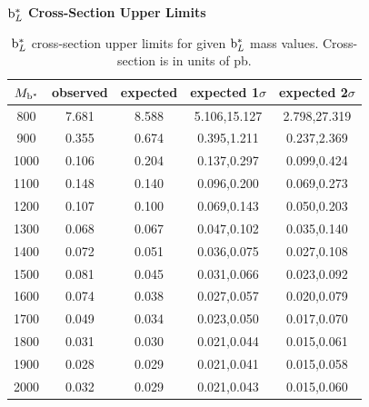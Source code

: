 \begin{table}
\begin{center}
\bf{$\mathrm{b}^{*}_L$ Cross-Section Upper Limits}\\
\begin{tabular}{|c||c|c|c|c|}
\hline
\bf{$M_{\mathrm{b}^{*}}$} & \bf{observed}  & \bf{expected} & \bf{expected 1$\sigma$}  & \bf{expected 2$\sigma$} \\
\hline
\hline
800 & 7.681 & 8.588 & 5.106,15.127 & 2.798,27.319\\ 
\hline
900 & 0.355 & 0.674 & 0.395,1.211 & 0.237,2.369\\ 
\hline
1000 & 0.106 & 0.204 & 0.137,0.297 & 0.099,0.424\\ 
\hline
1100 & 0.148 & 0.140 & 0.096,0.200 & 0.069,0.273\\ 
\hline
1200 & 0.107 & 0.100 & 0.069,0.143 & 0.050,0.203\\ 
\hline
1300 & 0.068 & 0.067 & 0.047,0.102 & 0.035,0.140\\ 
\hline
1400 & 0.072 & 0.051 & 0.036,0.075 & 0.027,0.108\\ 
\hline
1500 & 0.081 & 0.045 & 0.031,0.066 & 0.023,0.092\\ 
\hline
1600 & 0.074 & 0.038 & 0.027,0.057 & 0.020,0.079\\ 
\hline
1700 & 0.049 & 0.034 & 0.023,0.050 & 0.017,0.070\\ 
\hline
1800 & 0.031 & 0.030 & 0.021,0.044 & 0.015,0.061\\ 
\hline
1900 & 0.028 & 0.029 & 0.021,0.041 & 0.015,0.058\\ 
\hline
2000 & 0.032 & 0.029 & 0.021,0.043 & 0.015,0.060\\ 
\hline
\end{tabular}
\end{center}
\caption{$\mathrm{b}^{*}_L$ cross-section upper limits for given $\mathrm{b}^{*}_L$ mass values.  Cross-section is in units of pb.}
\label{table:bsupperxsecL}
\end{table}


